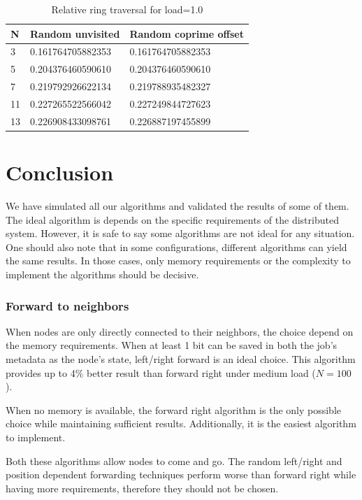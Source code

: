 \documentclass[10pt,a4paper]{article}
\begin{document}
\begin{table}[h!]
\centering
\begin{tabular}{|l|l|l|} \hline
N	& Random unvisited	& Random coprime offset \\ \hline
3	&   0.161764705882353 &  0.161764705882353 \\
5	&   0.204376460590610 &  0.204376460590610 \\
7	&   0.219792926622134 &  0.219788935482327 \\
11	&   0.227265522566042 &  0.227249844727623 \\
13	&   0.226908433098761 &  0.226887197455899 \\ \hline
\end{tabular}
\caption{Relative ring traversal for load=1.0}
\end{table}

\section{Conclusion}
\label{secconclusion}

We have simulated all our algorithms and validated the results of some of them. The ideal algorithm is depends on the specific requirements of the distributed system. However, it is safe to say some algorithms are not ideal for any situation. One should also note that in some configurations, different algorithms can yield the same results. In those cases, only memory requirements or the complexity to implement the algorithms should be decisive.

\subsubsection*{Forward to neighbors}
When nodes are only directly connected to their neighbors, the choice depend on the memory requirements. When at least 1 bit can be saved in both the job's metadata as the node's state, left/right forward is an ideal choice. This algorithm provides up to 4\% better result than forward right under medium load ($N=100$).

When no memory is available, the forward right algorithm is the only possible choice while maintaining sufficient results. Additionally, it is the easiest algorithm to implement.

Both these algorithms allow nodes to come and go. The random left/right and position dependent forwarding techniques perform worse than forward right while having more requirements, therefore they should not be chosen.
\end{document}
